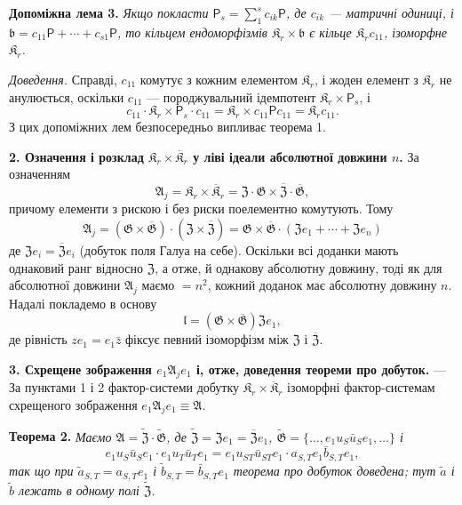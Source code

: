 \documentclass[11pt]{article}
\begin{document}
\noindent\textbf{Допоміжна лема 3.} \emph{Якщо покласти \(\mathsf{P}_s=\sum_1^s c_{ik}\mathsf{P}\), де \(c_{ik}\) --- матричні одиниці, і \(\mathfrak b=c_{11}\mathsf{P}+\cdots+c_{s1}\mathsf{P}\), то кільцем ендоморфізмів \(\mathfrak K_r\times\mathfrak b\) є кільце \(\mathfrak K_rc_{11}\), ізоморфне \(\mathfrak K_r\).}

\noindent\emph{Доведення.} Справді, \(c_{11}\) комутує з кожним елементом \(\mathfrak K_r\), і жоден елемент з \(\mathfrak K_r\) не анулюється, оскільки \(c_{11}\) --- породжувальний ідемпотент \(\mathfrak K_r\times \mathsf{P}_s\), і
\[
c_{11}\cdot\mathfrak K_r\times \mathsf{P}_s\cdot c_{11}
=\mathfrak K_r\times c_{11}\mathsf Pc_{11}
=\mathfrak K_rc_{11}.
\]
З цих допоміжних лем безпосередньо випливає теорема 1.

\noindent\textbf{2. Означення і розклад \(\mathfrak K_r\times\overline{\mathfrak K}_r\) у ліві ідеали абсолютної довжини \(n\).} За означенням
\[
\mathfrak A_j=\mathfrak K_r\times\overline{\mathfrak K}_r
=\mathfrak Z\cdot\mathfrak G\times\overline{\mathfrak Z}\cdot\overline{\mathfrak G},
\]
причому елементи з рискою і без риски поелементно комутують. Тому
\[
\mathfrak A_j
=(\mathfrak G\times\overline{\mathfrak G})\cdot(\mathfrak Z\times\overline{\mathfrak Z})
=\mathfrak G\times\overline{\mathfrak G}\cdot(\mathfrak Ze_1+\cdots+\mathfrak Ze_n)
\]
де \(\mathfrak Ze_i=\overline{\mathfrak Z}e_i\) (добуток поля Галуа на себе). Оскільки всі доданки мають однаковий ранг відносно \(\mathfrak Z\), а отже, й однакову абсолютну довжину, тоді як для абсолютної довжини \(\mathfrak A_j\) маємо \(=n^2\), кожний доданок має абсолютну довжину \(n\). Надалі покладемо в основу
\[
\mathfrak l=(\mathfrak G\times\overline{\mathfrak G})\mathfrak Ze_1,
\]
де рівність \(ze_1=e_1\bar z\) фіксує певний ізоморфізм між \(\mathfrak Z\) і \(\overline{\mathfrak Z}\).

\noindent\textbf{3. Схрещене зображення \(e_1\mathfrak A_je_1\) і, отже, доведення теореми про добуток.} --- За пунктами 1 і 2 фактор-системи добутку \(\mathfrak K_r\times\overline{\mathfrak K}_r\) ізоморфні фактор-системам схрещеного зображення \(e_1\mathfrak A_je_1\equiv\mathfrak A\).

\noindent\textbf{Теорема 2.} \emph{Маємо \(\mathfrak A=\widetilde{\mathfrak Z}\cdot\widetilde{\mathfrak G}\), де \(\widetilde{\mathfrak Z}=\mathfrak Ze_1=\overline{\mathfrak Z}e_1\), \(\widetilde{\mathfrak G}=\{\ldots,e_1u_S\bar u_Se_1,\ldots\}\) і
\[
e_1u_S\bar u_Se_1\cdot e_1u_T\bar u_Te_1
=e_1u_{ST}\bar u_{ST}e_1\cdot a_{S,T}e_1\bar b_{S,T}e_1,
\]
так що при \(\tilde a_{S,T}=a_{S,T}e_1\) і \(\tilde b_{S,T}=\bar b_{S,T}e_1\) теорема про добуток доведена; тут \(\tilde a\) і \(\tilde b\) лежать в одному полі \(\widetilde{\mathfrak Z}\).}
\end{document}

